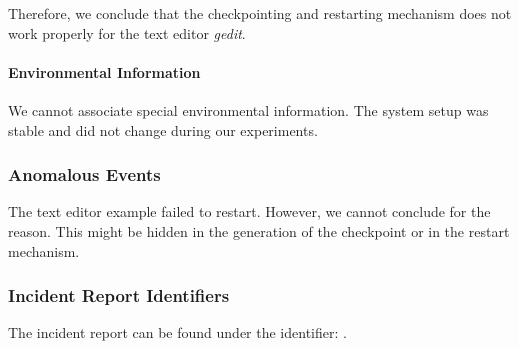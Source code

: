 Therefore, we conclude that the checkpointing and restarting mechanism does not work properly for the text editor \emph{gedit}.

\paragraph{Environmental Information}
We cannot associate special environmental information. The system setup was stable and did not change during our experiments.

\subsubsection{Anomalous Events}
The text editor example failed to restart. However, we cannot conclude for the
reason. This might be hidden in the generation of the checkpoint or in
the restart mechanism.

\subsubsection{Incident Report Identifiers}
The incident report can be found under the identifier: .
